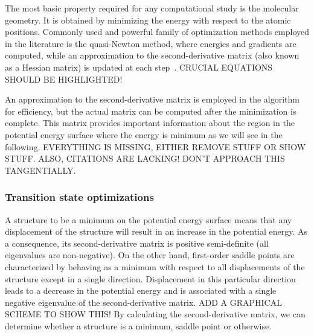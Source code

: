 The most basic property required for any computational study is the molecular
geometry.
It is obtained by minimizing the energy with respect to the atomic positions.
Commonly used and powerful family of optimization methods employed in the
literature is the quasi-Newton method, where energies and gradients are
computed, while an approximation to the second-derivative matrix (also known as
a Hessian matrix) is updated at each step~\cite{Banerjee_1985,Schlegel_1987}.
CRUCIAL EQUATIONS SHOULD BE HIGHLIGHTED!\@

An approximation to the second-derivative matrix is employed in the algorithm
for efficiency, but the actual matrix can be computed after the minimization is
complete.
This matrix provides important information about the region in the potential
energy surface where the energy is minimum as we will see in the following.
EVERYTHING IS MISSING, EITHER REMOVE STUFF OR SHOW STUFF.\@
ALSO, CITATIONS ARE LACKING!\@
DON'T APPROACH THIS TANGENTIALLY.\@

\subsubsection{Transition state optimizations}\label{sec:ts-optimizations}

A structure to be a minimum on the potential energy surface means that any
displacement of the structure will result in an increase in the potential
energy.
As a consequence, its second-derivative matrix
is positive semi-definite (all eigenvalues are non-negative).
On the other hand, first-order saddle points are characterized by behaving as
a minimum with respect to all displacements of the structure except in a single
direction.
Displacement in this particular direction leads to a decrease in the potential
energy and is associated with a single negative eigenvalue of the
second-derivative matrix.
ADD A GRAPHICAL SCHEME TO SHOW THIS!\@
By calculating the second-derivative matrix, we can determine whether a structure
is a minimum, saddle point or otherwise.

